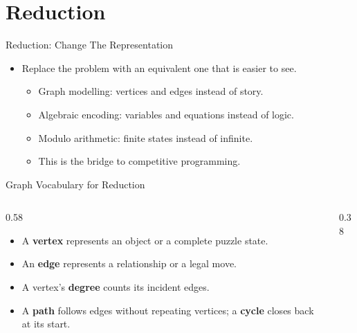 \documentclass{beamer}
\begin{document}
\section{Reduction}

\begin{frame}{Reduction: Change The Representation}
    \pause
    \begin{itemize}
        \item Replace the problem with an equivalent one that is easier to see.
            \begin{itemize}
                \item Graph modelling: vertices and edges instead of story.
                \item Algebraic encoding: variables and equations
                    instead of logic.
                \item Modulo arithmetic: finite states instead of infinite.
                \item This is the bridge to competitive programming.
            \end{itemize}
    \end{itemize}
\end{frame}

\begin{frame}[<1->]{Graph Vocabulary for Reduction}
    \begin{columns}[c,onlytextwidth]
        \begin{column}{0.58\textwidth}
            \begin{itemize}
                \item A \textbf{vertex} represents an object or a complete
                    puzzle state.
                \item An \textbf{edge} represents a relationship or a legal move.
                \item A vertex's \textbf{degree} counts its incident edges.
                \item A \textbf{path} follows edges without repeating vertices;
                    a \textbf{cycle} closes back at its start.
            \end{itemize}
        \end{column}
        \begin{column}{0.38\textwidth}
            \centering
        \end{column}
    \end{columns}
\end{frame}
\end{document}
